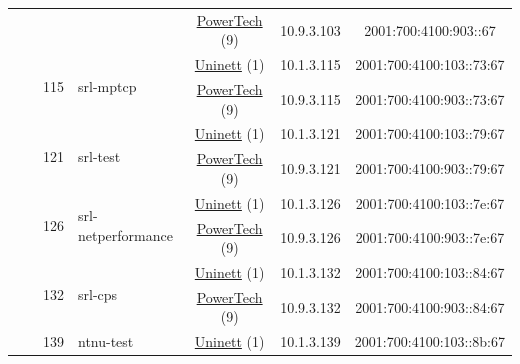 \begin{small}
\begin{center}
\begin{longtable}{|c|c|c|c|c|c|c|c|}
  &  & \multicolumn{2}{|c|}{} & \multicolumn{2}{|c|}{\tiny{\href{http://www.powertech.no}{PowerTech} (9)}} & \tiny{10.9.3.103} & \tiny{2001:700:4100:903::67} \\* \cline{3-3}\cline{4-4}\cline{5-5}\cline{6-6}\cline{7-7}\cline{8-8}
  &  & \multirow{2}{*}{\tiny{115}} & \multicolumn{1}{|l|}{\multirow{2}{*}{\tiny{srl-mptcp}}} & \multicolumn{2}{|c|}{\tiny{\href{https://www.uninett.no}{Uninett} (1)}} & \tiny{10.1.3.115} & \tiny{2001:700:4100:103::73:67} \\* \cline{5-5}\cline{6-6}\cline{7-7}\cline{8-8}
  &  &  &  & \multicolumn{2}{|c|}{\tiny{\href{http://www.powertech.no}{PowerTech} (9)}} & \tiny{10.9.3.115} & \tiny{2001:700:4100:903::73:67} \\* \cline{3-3}\cline{4-4}\cline{5-5}\cline{6-6}\cline{7-7}\cline{8-8}
  &  & \multirow{2}{*}{\tiny{121}} & \multicolumn{1}{|l|}{\multirow{2}{*}{\tiny{srl-test}}} & \multicolumn{2}{|c|}{\tiny{\href{https://www.uninett.no}{Uninett} (1)}} & \tiny{10.1.3.121} & \tiny{2001:700:4100:103::79:67} \\* \cline{5-5}\cline{6-6}\cline{7-7}\cline{8-8}
  &  &  &  & \multicolumn{2}{|c|}{\tiny{\href{http://www.powertech.no}{PowerTech} (9)}} & \tiny{10.9.3.121} & \tiny{2001:700:4100:903::79:67} \\* \cline{3-3}\cline{4-4}\cline{5-5}\cline{6-6}\cline{7-7}\cline{8-8}
  &  & \multirow{2}{*}{\tiny{126}} & \multicolumn{1}{|l|}{\multirow{2}{*}{\tiny{srl-netperformance}}} & \multicolumn{2}{|c|}{\tiny{\href{https://www.uninett.no}{Uninett} (1)}} & \tiny{10.1.3.126} & \tiny{2001:700:4100:103::7e:67} \\* \cline{5-5}\cline{6-6}\cline{7-7}\cline{8-8}
  &  &  &  & \multicolumn{2}{|c|}{\tiny{\href{http://www.powertech.no}{PowerTech} (9)}} & \tiny{10.9.3.126} & \tiny{2001:700:4100:903::7e:67} \\* \cline{3-3}\cline{4-4}\cline{5-5}\cline{6-6}\cline{7-7}\cline{8-8}
  &  & \multirow{2}{*}{\tiny{132}} & \multicolumn{1}{|l|}{\multirow{2}{*}{\tiny{srl-cps}}} & \multicolumn{2}{|c|}{\tiny{\href{https://www.uninett.no}{Uninett} (1)}} & \tiny{10.1.3.132} & \tiny{2001:700:4100:103::84:67} \\* \cline{5-5}\cline{6-6}\cline{7-7}\cline{8-8}
  &  &  &  & \multicolumn{2}{|c|}{\tiny{\href{http://www.powertech.no}{PowerTech} (9)}} & \tiny{10.9.3.132} & \tiny{2001:700:4100:903::84:67} \\* \cline{3-3}\cline{4-4}\cline{5-5}\cline{6-6}\cline{7-7}\cline{8-8}
  &  & \multirow{2}{*}{\tiny{139}} & \multicolumn{1}{|l|}{\multirow{2}{*}{\tiny{ntnu-test}}} & \multicolumn{2}{|c|}{\tiny{\href{https://www.uninett.no}{Uninett} (1)}} & \tiny{10.1.3.139} & \tiny{2001:700:4100:103::8b:67} \\* \cline{5-5}\cline{6-6}\cline{7-7}\cline{8-8}

\end{longtable}
\end{center}
\end{small}
